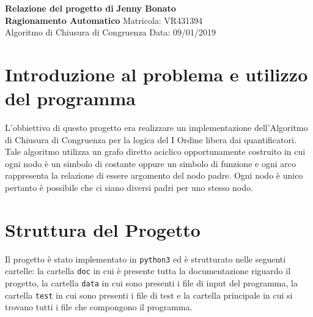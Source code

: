 \documentclass[a4paper, 11pt]{article}
\begin{document}
\noindent
\large\textbf{Relazione del progetto di} \hfill \textbf{Jenny Bonato} \\
\large\textbf{Ragionamento Automatico} \hfill Matricola: VR431394 \\
Algoritmo di Chiusura di Congruenza \hfill Data: 09/01/2019 \\

\section*{Introduzione al problema e utilizzo del programma}
L'obbiettivo di questo progetto era realizzare un implementazione dell'Algoritmo di Chiusura di Congruenza per la logica del I Ordine libera dai quantificatori. Tale algoritmo utilizza un grafo diretto aciclico opportunamente costruito in cui ogni nodo è un simbolo di costante oppure un simbolo di funzione e ogni arco rappresenta la relazione di essere argomento del nodo padre. Ogni nodo è unico pertanto è possibile che ci siano diversi padri per uno stesso nodo.

\section*{Struttura del Progetto}
Il progetto è stato implementato in \verb|python3| ed è strutturato nelle seguenti cartelle: la cartella \verb|doc| in cui è presente tutta la documentazione riguardo il progetto, la cartella \verb|data| in cui sono presenti i file di input del programma, la cartella \verb|test| in cui sono presenti i file di test e la cartella principale in cui si trovano tutti i file che compongono il programma.
\end{document}
